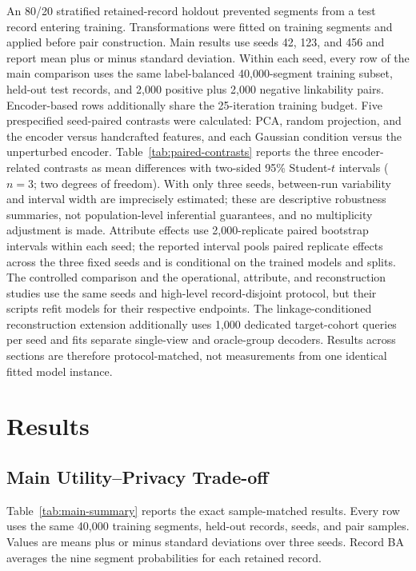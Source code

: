 \documentclass[journal]{IEEEtran}
\begin{document}
An 80/20 stratified retained-record holdout prevented segments from a test
record entering training. Transformations were fitted on training segments
and applied before pair construction. Main results use seeds 42, 123, and 456
and report mean plus or minus standard deviation. Within each seed, every row
of the main comparison uses the same label-balanced 40,000-segment training
subset, held-out test records, and 2,000 positive plus 2,000 negative
linkability pairs. Encoder-based rows additionally share the 25-iteration
training budget. Five prespecified seed-paired contrasts were calculated:
PCA, random projection, and the encoder versus handcrafted features, and each
Gaussian condition versus the unperturbed encoder.
Table~\ref{tab:paired-contrasts} reports the three encoder-related contrasts
as mean differences with two-sided 95\% Student-$t$ intervals ($n=3$; two
degrees of freedom). With only three seeds, between-run variability and
interval width are imprecisely estimated; these are descriptive robustness
summaries, not population-level inferential guarantees, and no multiplicity
adjustment is made.
Attribute effects use 2,000-replicate paired bootstrap
intervals within each seed; the reported interval pools paired replicate
effects across the three fixed seeds and is conditional on the trained models
and splits. The controlled comparison and the operational, attribute, and
reconstruction studies use the same seeds and high-level record-disjoint
protocol, but their scripts refit models for their respective endpoints.
The linkage-conditioned reconstruction extension additionally uses 1,000
dedicated target-cohort queries per seed and fits separate single-view and
oracle-group decoders.
Results across sections are therefore protocol-matched, not measurements from
one identical fitted model instance.

\section{Results}
\label{sec:results}

\subsection{Main Utility--Privacy Trade-off}
\label{subsec:results-main}

Table~\ref{tab:main-summary} reports the exact sample-matched results. Every row
uses the same 40,000 training segments, held-out records, seeds, and pair
samples. Values are means plus or minus standard deviations over three seeds.
Record BA averages the nine segment probabilities for each retained record.
\end{document}
